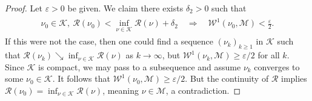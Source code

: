 \documentclass[11pt,reqno]{amsart}
\numberwithin{equation}{section}
\theoremstyle{definition}
\begin{document}
\begin{proof}
Let ${\varepsilon} > 0$ be given.
We claim there exists $\delta_2 > 0$ such that
{\begin{align} \begin{split} {
\nu_0 \in {\mathcal{K}},\ {\mathcal{R}}(\nu_0) < \inf_{\nu \in {\mathcal{K}}} {\mathcal{R}}(\nu) + \delta_2 \quad \Rightarrow \quad \label{setup1}
{\mathcal{W}}^1(\nu_0,{\mathcal{M}}) < \frac{\varepsilon}{2}.
} \end{split} \end{align}}
If this were not the case, then one could find a sequence $(\nu_k)_{k \geq 1}$ in ${\mathcal{K}}$ such that
${\mathcal{R}}(\nu_k) \searrow \inf_{\nu \in {\mathcal{K}}} {\mathcal{R}}(\nu)$ as $k \to \infty$, but ${\mathcal{W}}^1(\nu_k,{\mathcal{M}}) \geq {\varepsilon}/2$ for all $k$.
Since ${\mathcal{K}}$ is compact, we may pass to a subsequence and assume $\nu_k$ converges to some $\nu_0 \in {\mathcal{K}}$.
It follows that ${\mathcal{W}}^1(\nu_0,{\mathcal{M}}) \geq {\varepsilon}/2$.
But the continuity of ${\mathcal{R}}$ implies ${\mathcal{R}}(\nu_0) = \inf_{\nu \in {\mathcal{K}}} {\mathcal{R}}(\nu)$, meaning $\nu \in {\mathcal{M}}$, a contradiction.


\end{proof}
\end{document}
